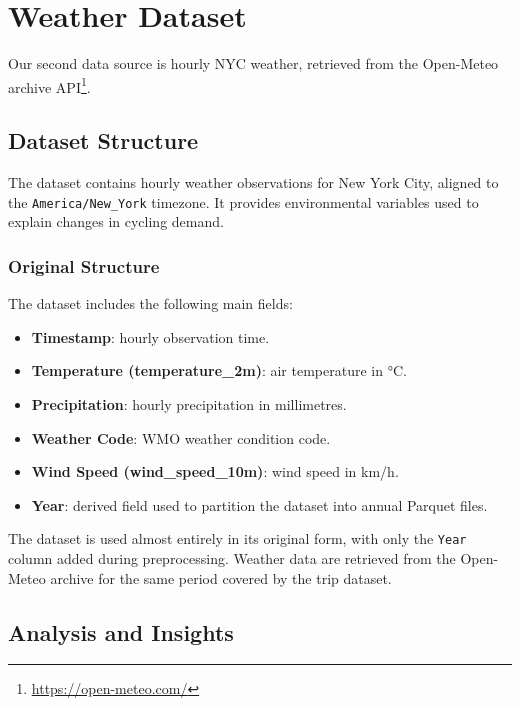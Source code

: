 \section{Weather Dataset}
Our second data source is hourly NYC weather, retrieved from the Open-Meteo archive API\footnote{\url{https://open-meteo.com/}}.

\subsection{Dataset Structure}

The dataset contains hourly weather observations for New York City, aligned to the \texttt{America/New\_York} timezone. It provides environmental variables used to explain changes in cycling demand.

\subsubsection{Original Structure}

The dataset includes the following main fields:
\begin{itemize}
  \item \textbf{Timestamp}: hourly observation time.
  \item \textbf{Temperature (temperature\_2m)}: air temperature in \si{\degreeCelsius}.
  \item \textbf{Precipitation}: hourly precipitation in millimetres.
  \item \textbf{Weather Code}: WMO weather condition code.
  \item \textbf{Wind Speed (wind\_speed\_10m)}: wind speed in km/h.
  \item \textbf{Year}: derived field used to partition the dataset into annual Parquet files.
\end{itemize}

The dataset is used almost entirely in its original form, with only the \texttt{Year} column added during preprocessing. Weather data are retrieved from the Open-Meteo archive for the same period covered by the trip dataset.

\subsection{Analysis and Insights}

